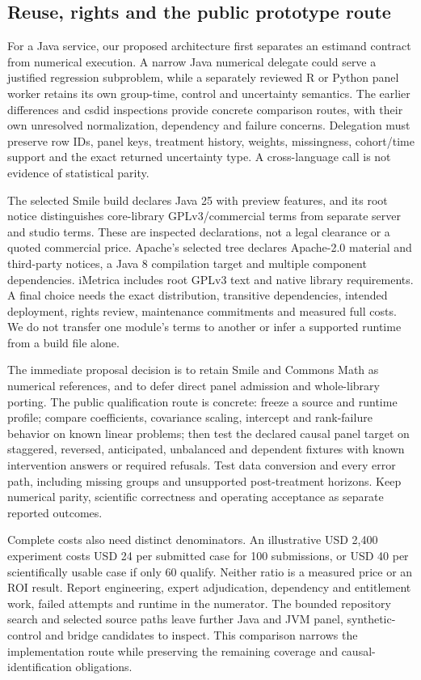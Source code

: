 \subsection{Reuse, rights and the public prototype route}
For a Java service, our proposed architecture first separates an estimand
contract from numerical execution. A narrow Java numerical delegate could
serve a justified regression subproblem, while a separately reviewed R or
Python panel worker retains its own group-time, control and uncertainty
semantics. The earlier differences and csdid inspections provide concrete
comparison routes, with their own unresolved normalization, dependency and
failure concerns. Delegation must preserve row IDs, panel keys, treatment
history, weights, missingness, cohort/time support and the exact returned
uncertainty type. A cross-language call is not evidence of statistical parity.
\citep{exec24_panelpy_differences,exec24_panelpy_csdid,exec25_paneljava_reference}

The selected Smile build declares Java 25 with preview features, and its
root notice distinguishes core-library GPLv3/commercial terms from separate
server and studio terms. These are inspected declarations, not a legal
clearance or a quoted commercial price. Apache's selected tree declares
Apache-2.0 material and third-party notices, a Java 8 compilation target
and multiple component dependencies. iMetrica includes root GPLv3 text and
native library requirements. A final choice needs the exact distribution,
transitive dependencies, intended deployment, rights review, maintenance
commitments and measured full costs. We do not transfer one module's terms
to another or infer a supported runtime from a build file alone.
\citep{exec25_paneljava_smile,exec25_paneljava_commons,exec25_paneljava_imetrica}

The immediate proposal decision is to retain Smile and Commons Math as
numerical references, and to defer direct panel admission and whole-library
porting. The public qualification route is concrete: freeze a source and
runtime profile; compare coefficients, covariance scaling, intercept and
rank-failure behavior on known linear problems; then test the declared causal
panel target on staggered, reversed, anticipated, unbalanced and dependent
fixtures with known intervention answers or required refusals. Test data
conversion and every error path, including missing groups and unsupported
post-treatment horizons. Keep numerical parity, scientific correctness and
operating acceptance as separate reported outcomes.
\citep{exec25_paneljava_reference}

Complete costs also need distinct denominators. An illustrative USD 2,400
experiment costs USD 24 per submitted case for 100 submissions, or USD 40
per scientifically usable case if only 60 qualify. Neither ratio is a
measured price or an ROI result. Report engineering, expert adjudication,
dependency and entitlement work, failed attempts and runtime in the numerator.
The bounded repository search and selected source paths leave further Java
and JVM panel, synthetic-control and bridge candidates to inspect. This
comparison narrows the implementation route while preserving the remaining
coverage and causal-identification obligations.\citep{exec25_paneljava_reference}
